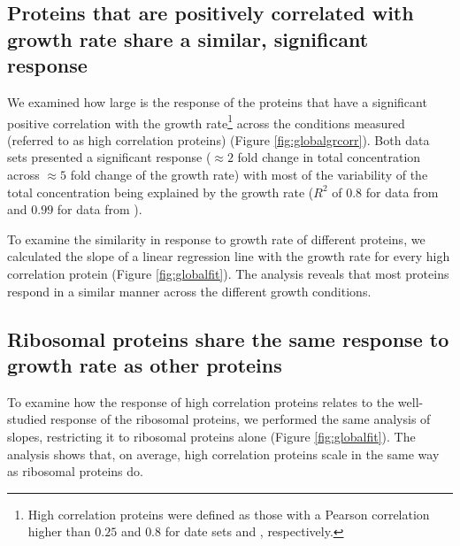 \documentclass[a4paper,landscape,17pt]{extarticle}
\begin{document}
\clearpage        
\subsection*{Proteins that are positively correlated with growth rate share a similar, significant response}
We examined how large is the response of the proteins that have a significant positive correlation with the growth rate\footnote{High correlation proteins were defined as those with a Pearson correlation higher than $0.25$ and $0.8$ for date sets \parencite{Heinemann2014} and \parencite{Valgepea2013}, respectively.} across the conditions measured (referred to as high correlation proteins) (Figure \ref{fig:globalgrcorr}).
Both data sets presented a significant response ($\approx 2$ fold change in total concentration across $\approx 5$ fold change of the growth rate) with most of the variability of the total concentration being explained by the growth rate ($R^2$ of $0.8$ for data from \parencite{Heinemann2014} and $0.99$ for data from \parencite{Valgepea2013}). 

To examine the similarity in response to growth rate of different proteins, we calculated the slope of a linear regression line with the growth rate for every high correlation protein (Figure \ref{fig:globalfit}).
The analysis reveals that most proteins respond in a similar manner across the different growth conditions.
\clearpage        

\subsection*{Ribosomal proteins share the same response to growth rate as other proteins}
To examine how the response of high correlation proteins relates to the well-studied response of the ribosomal proteins, we performed the same analysis of slopes, restricting it to ribosomal proteins alone (Figure \ref{fig:globalfit}).
The analysis shows that, on average, high correlation proteins scale in the same way as ribosomal proteins do.
\clearpage        
\end{document}
